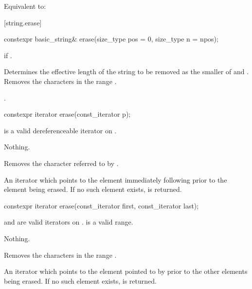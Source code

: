\begin{itemdescr}
\pnum
\effects
Equivalent to: 
\end{itemdescr}

[string.erase]{}

%
\begin{itemdecl}
constexpr basic_string& erase(size_type pos = 0, size_type n = npos);
\end{itemdecl}

\begin{itemdescr}
\pnum
\throws
{}
if 
.

\pnum
\effects
Determines the effective length 
of the string to be removed as the smaller of  and
.
Removes the characters in the range .

\pnum
\returns
{}.
\end{itemdescr}

%
\begin{itemdecl}
constexpr iterator erase(const_iterator p);
\end{itemdecl}

\begin{itemdescr}
\pnum
\expects
{} is a valid dereferenceable iterator on .

\pnum
\throws
Nothing.

\pnum
\effects
Removes the character referred to by .

\pnum
\returns
An iterator which points to the element immediately following  prior to
the element being erased.
If no such element exists,
is returned.
\end{itemdescr}

%
\begin{itemdecl}
constexpr iterator erase(const_iterator first, const_iterator last);
\end{itemdecl}

\begin{itemdescr}
\pnum
\expects
{} and  are valid iterators on
.  is a valid range.

\pnum
\throws
Nothing.

\pnum
\effects
Removes the characters in the range
.

\pnum
\returns
An iterator which points to the element pointed to by  prior to
the other elements being erased.
If no such element exists,
is returned.
\end{itemdescr}

